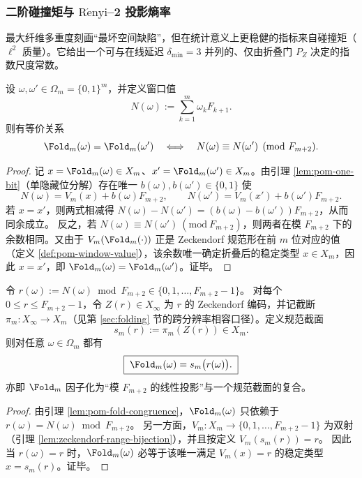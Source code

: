 \subsubsection{二阶碰撞矩与 \texorpdfstring{$\mathrm{R\acute{e}nyi}$}{Renyi}--2 投影熵率}\label{subsec:pom-s2}
最大纤维多重度刻画“最坏空间缺陷”，但在统计意义上更稳健的指标来自碰撞矩（\(\ell^2\) 质量）。它给出一个可与在线延迟 \(\delta_{\min}=3\) 并列的、仅由折叠门 \(P_Z\) 决定的指数尺度常数。

\begin{lemma}\label{lem:pom-fold-congruence}
设 \(\omega,\omega'\in\Omega_m=\{0,1\}^m\)，并定义窗口值
$$
N(\omega):=\sum_{k=1}^m \omega_k F_{k+1}.
$$
则有等价关系
$$
\Fold_m(\omega)=\Fold_m(\omega')
\quad\Longleftrightarrow\quad
N(\omega)\equiv N(\omega')\pmod{F_{m+2}}.
$$
\end{lemma}
\begin{proof}
记 \(x=\Fold_m(\omega)\in X_m\)、\(x'=\Fold_m(\omega')\in X_m\)。由引理 \ref{lem:pom-one-bit}（单隐藏位分解）存在唯一 \(b(\omega),b(\omega')\in\{0,1\}\) 使
$$
N(\omega)=V_m(x)+b(\omega)F_{m+2},\qquad
N(\omega')=V_m(x')+b(\omega')F_{m+2}.
$$
若 \(x=x'\)，则两式相减得 \(N(\omega)-N(\omega')=(b(\omega)-b(\omega'))F_{m+2}\)，从而同余成立。
反之，若 \(N(\omega)\equiv N(\omega')\ (\mathrm{mod}\ F_{m+2})\)，则两者在模 \(F_{m+2}\) 下的余数相同。又由于 \(V_m(\Fold_m(\cdot))\) 正是 Zeckendorf 规范形在前 \(m\) 位对应的值（定义 \ref{def:pom-window-value}），该余数唯一确定折叠后的稳定类型 \(x\in X_m\)，因此 \(x=x'\)，即 \(\Fold_m(\omega)=\Fold_m(\omega')\)。证毕。
\end{proof}

\begin{proposition}[折叠作为模同余投影的规范截面]\label{prop:pom-fold-as-section}
令 \(r(\omega):=N(\omega)\bmod F_{m+2}\in\{0,1,\dots,F_{m+2}-1\}\)。
对每个 \(0\le r\le F_{m+2}-1\)，令 \(Z(r)\in X_\infty\) 为 \(r\) 的 Zeckendorf 编码，并记截断 \(\pi_m: X_\infty\to X_m\)（见第 \ref{sec:folding} 节的跨分辨率相容口径）。定义规范截面
\[
s_m(r):=\pi_m(Z(r))\in X_m.
\]
则对任意 \(\omega\in\Omega_m\) 都有
\[
\boxed{\;\Fold_m(\omega)=s_m\bigl(r(\omega)\bigr).\;}
\]
亦即 \(\Fold_m\) 因子化为“模 \(F_{m+2}\) 的线性投影”与一个规范截面的复合。
\end{proposition}
\begin{proof}
由引理 \ref{lem:pom-fold-congruence}，\(\Fold_m(\omega)\) 只依赖于 \(r(\omega)=N(\omega)\bmod F_{m+2}\)。
另一方面，\(V_m:X_m\to\{0,1,\dots,F_{m+2}-1\}\) 为双射（引理 \ref{lem:zeckendorf-range-bijection}），并且按定义 \(V_m(s_m(r))=r\)。
因此当 \(r(\omega)=r\) 时，\(\Fold_m(\omega)\) 必等于该唯一满足 \(V_m(x)=r\) 的稳定类型 \(x=s_m(r)\)。证毕。
\end{proof}

